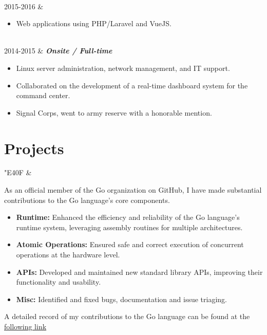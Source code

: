 \documentclass[]{cv-mauri}
\begin{document}
\begin{tabularcv}
		    \\[\vspacepar]
    2015-2016   &   
            \begin{itemize}
                  	\item Web applications using PHP/Laravel and VueJS.
            \end{itemize}
                    
                    \\[\vspacepar]
	2014-2015   &   
					\textbf{\textit{Onsite / Full-time}}

			\begin{itemize}
				\item Linux server administration, network management, and IT support.
				\item Collaborated on the development of a real-time dashboard system for the command center.
				\item Signal Corps, went to army reserve with a honorable mention.
			\end{itemize}
\end{tabularcv}

\section*{Projects}
\begin{tabularcv}
	{\Huge \color[HTML]{76E1FE} \FAB \char"E40F} & 

		As an official member of the Go organization on GitHub, I have made substantial contributions to the Go language's core components.
		
		\begin{itemize}
			\item \textbf{Runtime:} Enhanced the efficiency and reliability of the Go language's runtime system, leveraging assembly routines for multiple architectures.
			\item \textbf{Atomic Operations:} Ensured safe and correct execution of concurrent operations at the hardware level.
			\item \textbf{APIs:} Developed and maintained new standard library APIs, improving their functionality and usability.
			\item \textbf{Misc:} Identified and fixed bugs, documentation and issue triaging.
		\end{itemize}

		A detailed record of my contributions to the Go language can be found at the \color{maincolor}\href{https://go-review.googlesource.com/q/author:mauri870@gmail.com}{following link}
\end{tabularcv}
\end{document}
